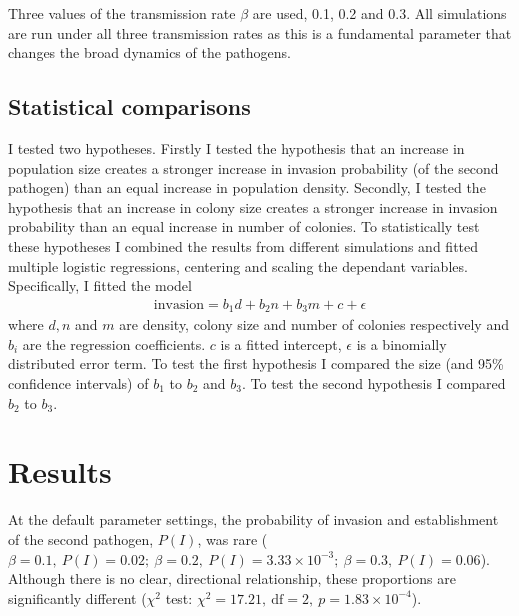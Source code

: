 Three values of the transmission rate $\beta$ are used, 0.1, 0.2 and 0.3.
All simulations are run under all three transmission rates as this is a fundamental parameter that changes the broad dynamics of the pathogens.


\subsection{Statistical comparisons}

I tested two hypotheses.
Firstly I tested the hypothesis that an increase in population size creates a stronger increase in invasion probability (of the second pathogen) than an equal increase in population density.
Secondly, I tested the hypothesis that an increase in colony size creates a stronger increase in invasion probability than an equal increase in number of colonies.
To statistically test these hypotheses I combined the results from different simulations and fitted multiple logistic regressions, centering and scaling the dependant variables.
Specifically, I fitted the model 
\begin{align}
  \text{invasion} = b_1 d + b_2 n + b_3 m + c + \epsilon
\end{align}
where $d, n$ and $m$ are density, colony size and number of colonies respectively and $b_i$ are the regression coefficients. 
$c$ is a fitted intercept, $\epsilon$ is a binomially distributed error term.
To test the first hypothesis I compared the size (and 95\% confidence intervals) of $b_1$ to $b_2$ and $b_3$.
To test the second hypothesis I compared $b_2$ to $b_3$.








\section{Results}





At the default parameter settings, the probability of invasion and establishment of the second pathogen, $P(I)$,  was rare ($\beta = 0.1,\: P(I) = 0.02;\: \beta = 0.2,\: P(I) = \ensuremath{3.33\times 10^{-3}};\: \beta = 0.3,\: P(I) = 0.06$).
Although there is no clear, directional relationship, these proportions are significantly different ($\chi^2$ test: $\chi^2 = 17.21,\: \text{df} = 2,\: p = \ensuremath{1.83\times 10^{-4}}$).

